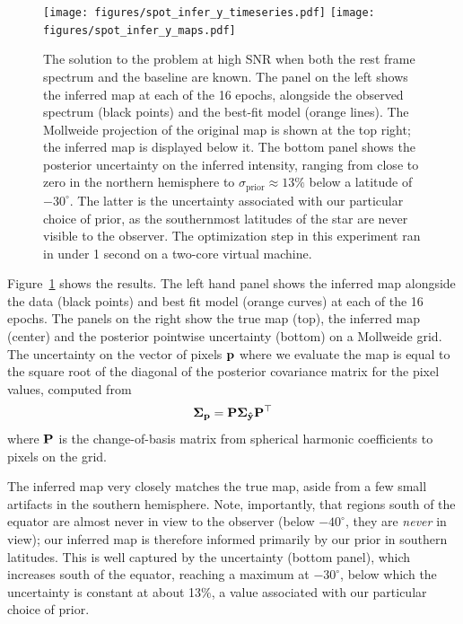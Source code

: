 \documentclass[modern]{aastex631}
\def\timeInferY{under 1 second\xspace}
\begin{document}
\begin{figure}[p!]
    \begin{centering}
        \texttt{[image: figures/spot\_infer\_y\_timeseries.pdf]}
        \texttt{[image: figures/spot\_infer\_y\_maps.pdf]}
        \caption{%
            The solution to the \spot problem at high SNR when both the rest frame spectrum and the baseline are known.
            The panel on the left shows the inferred map at each of the 16 epochs, alongside the observed spectrum (black points) and the best-fit model (orange lines). 
            The Mollweide projection of the original map is shown at the top right; the inferred map is displayed below it. 
            The bottom panel shows the posterior uncertainty on the inferred intensity, ranging from close to zero in the northern hemisphere to $\sigma_\mathrm{prior} \approx 13\%$ below a latitude of $-30^\circ$. 
            The latter is the uncertainty associated with our particular choice of prior, as the southernmost latitudes of the star are never visible to the observer.
            The optimization step in this experiment ran in \timeInferY on a two-core virtual machine.
        }
        \label{fig:spot_infer_y}
    \end{centering}
\end{figure}

Figure~\ref{fig:spot_infer_y} shows the results.
The left hand panel shows the inferred map alongside the data (black points) and best fit model (orange curves) at each of the 16 epochs.
The panels on the right show the true map (top), the inferred map (center) and the posterior pointwise uncertainty (bottom) on a Mollweide grid. 
The uncertainty on the vector of pixels ${\mathbf{p}}$ where we evaluate the map is equal to the square root of the diagonal of the posterior covariance matrix for the pixel values, computed from
%
\begin{align}
    \label{eq:spotstar:uncert}
    \boldsymbol{\Sigma}_{\mathbf{p}} = {\mathbf{P}} \boldsymbol{\Sigma}_{\mathbf{\hat{y}}}{\mathbf{P}}^\top
\end{align}
%
where ${\mathbf{P}}$ is the change-of-basis matrix from spherical harmonic coefficients to pixels on the grid.

The inferred map very closely matches the true map, aside from a few small artifacts in the southern hemisphere.
Note, importantly, that regions south of the equator are almost never in view to the observer (below $-40^\circ$, they are \emph{never} in view); our inferred map is therefore informed primarily by our prior in southern latitudes.
This is well captured by the uncertainty (bottom panel), which increases south of the equator, reaching a maximum at $-30^\circ$, below which the uncertainty is constant at about 13\%, a value associated with our particular choice of prior.
\end{document}
